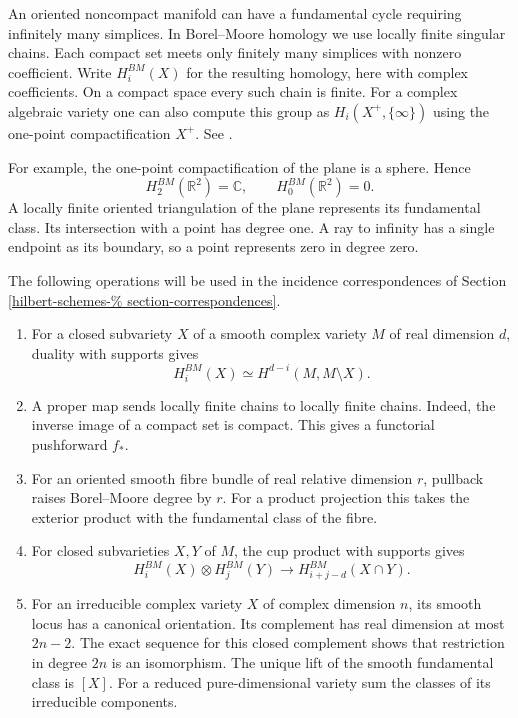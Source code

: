 An oriented noncompact manifold can have a
fundamental cycle requiring infinitely many
simplices. In Borel--Moore homology we use
locally finite singular chains. Each compact
set meets only finitely many simplices with
nonzero coefficient. Write $H_i^{BM}(X)$
for the resulting homology, here with
complex coefficients. On a compact space
every such chain is finite. For a complex
algebraic variety one can also compute this
group as $H_i(X^+,\{\infty\})$ using the
one-point compactification $X^+$.
See \cite[Section 8.2]{Nakajima-lectures}.

For example, the one-point compactification
of the plane is a sphere. Hence
$$
H_2^{BM}(\mathbb{R}^2)=\mathbb{C},\qquad
H_0^{BM}(\mathbb{R}^2)=0.
$$
A locally finite oriented triangulation of
the plane represents its fundamental class.
Its intersection with a point has degree
one. A ray to infinity has a single endpoint
as its boundary, so a point represents zero
in degree zero.

The following operations will be used in
the incidence correspondences of Section
\ref{hilbert-schemes-%
section-correspondences}.
\begin{enumerate}
\item
\label{item-isomorphism-relative-cohomology}
For a closed subvariety $X$ of a smooth
complex variety $M$ of real dimension $d$,
duality with supports gives
$$
H_i^{BM}(X)\simeq H^{d-i}(M,M\setminus X).
$$
\item
\label{item-pushforward}
A proper map sends locally finite chains
to locally finite chains. Indeed, the
inverse image of a compact set is compact.
This gives a functorial pushforward $f_*$.
\item
\label{item-pullback}
For an oriented smooth fibre bundle of real
relative dimension $r$, pullback raises
Borel--Moore degree by $r$. For a product
projection this takes the exterior product
with the fundamental class of the fibre.
\item
\label{item-intersection}
For closed subvarieties $X,Y$ of $M$, the
cup product with supports gives
$$
H_i^{BM}(X)\otimes H_j^{BM}(Y)
\longrightarrow H_{i+j-d}^{BM}(X\cap Y).
$$
\item
\label{item-fundamental-class}
For an irreducible complex variety $X$ of
complex dimension $n$, its smooth locus has
a canonical orientation. Its complement has
real dimension at most $2n-2$. The exact
sequence for this closed complement shows
that restriction in degree $2n$ is an
isomorphism. The unique lift of the smooth
fundamental class is $[X]$. For a reduced
pure-dimensional variety sum the classes of
its irreducible components.
\end{enumerate}

